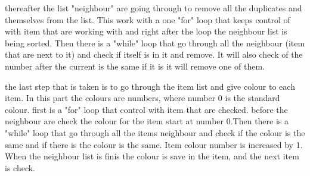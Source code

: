 thereafter the list "neighbour" are going through to remove all the duplicates and themselves from the list. This work with a one "for" loop that keeps control of with item that are working with and right after the loop the neighbour list is being sorted. Then there is a "while" loop that go through all the neighbour (item that are next to it) and check if itself is in it and remove. It will also check of the number after the current is the same if it is it will remove one of them.


the last step that is taken is to go through the item list and give colour to each item. In this part the colours are numbers, where number 0 is the standard colour. first is a "for" loop that control with item that are checked. before the neighbour are check the colour for the item start at number 0.Then there is a "while" loop that go through all the items neighbour and check if the colour is the same and if there is the colour is the same. Item colour number is increased by 1. When the neighbour list is finis the colour is save in the item, and the next item is check.